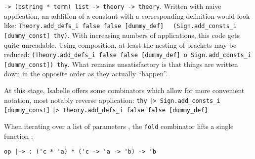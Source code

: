 \begin{isabellebody}
\begin{isamarkuptext}
\verb|-> (bstring * term) list -> theory -> theory|.
  Written with naive application, an addition of a constant with
  a corresponding definition would look like:
  \verb|Theory.add_defs_i false false [dummy_def]|\isasep\isanewline%
\verb|  (Sign.add_consts_i [dummy_const] thy)|.
  With increasing numbers of applications, this code gets quite unreadable.
  Using composition, at least the nesting of brackets may be reduced:
  \verb|(Theory.add_defs_i false false [dummy_def] o Sign.add_consts_i|\isasep\isanewline%
\verb|  [dummy_const]) thy|.
  What remains unsatisfactory is that things are written down in the opposite order
  as they actually ``happen''.%
\end{isamarkuptext}%
\isamarkuptrue%
%
\isadelimML
%
\endisadelimML
%
\isatagML
%
\endisatagML
{\isafoldML}%
%
\isadelimML
%
\endisadelimML
%
\begin{isamarkuptext}%
At this stage, Isabelle offers some combinators which allow for more convenient
  notation, most notably reverse application:
  \isasep\isanewline%
\verb|thy|\isasep\isanewline%
\verb||\verb,|,\verb|> Sign.add_consts_i [dummy_const]|\isasep\isanewline%
\verb||\verb,|,\verb|> Theory.add_defs_i false false [dummy_def]|%
\end{isamarkuptext}%
\isamarkuptrue%
%
\begin{isamarkuptext}%
\noindent When iterating over a list of parameters ,
  the \verb|fold| combinator lifts a single function :
\end{isamarkuptext}%
\isamarkuptrue%
%
\isadelimmlref
%
\endisadelimmlref
%
\isatagmlref
%
\begin{isamarkuptext}%
\begin{mldecls}
  \verb|op |\verb,|,\verb|-> : ('c * 'a) * ('c -> 'a -> 'b) -> 'b| \\

\end{mldecls}
\end{isamarkuptext}
\end{isabellebody}
